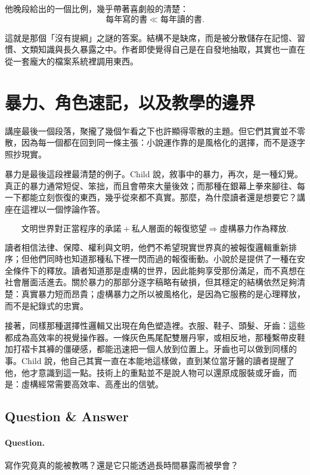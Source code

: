 他晚段給出的一個比例，幾乎帶著喜劇般的清楚：
\begin{equation}
\text{每年寫的書} \ll \text{每年讀的書}.
\end{equation}

這就是那個「沒有提綱」之謎的答案。結構不是缺席，而是被分散儲存在記憶、習慣、文類知識與長久暴露之中。作者即使覺得自己是在自發地抽取，其實也一直在從一套龐大的檔案系統裡調用東西。

\section{暴力、角色速記，以及教學的邊界}

講座最後一個段落，聚攏了幾個乍看之下也許顯得零散的主題。但它們其實並不零散，因為每一個都在回到同一條主張：小說運作靠的是風格化的選擇，而不是逐字照抄現實。

暴力是最後這段裡最清楚的例子。Child 說，敘事中的暴力，再次，是一種幻覺。真正的暴力通常短促、笨拙，而且會帶來大量後效；而那種在銀幕上拳來腳往、每一下都能立刻恢復的東西，幾乎從來都不真實。那麼，為什麼讀者還是想要它？講座在這裡以一個悖論作答。

\begin{equation}
\text{文明世界對正當程序的承諾} + \text{私人層面的報復慾望}
\Longrightarrow
\text{虛構暴力作為釋放}.
\end{equation}

讀者相信法律、保障、權利與文明，他們不希望現實世界真的被報復邏輯重新排序；但他們同時也知道那種私下裡一閃而過的報復衝動。小說於是提供了一種在安全條件下的釋放。讀者知道那是虛構的世界，因此能夠享受那份滿足，而不真想在社會層面活進去。關於暴力的那部分逐字稿略有破損，但其穩定的結構依然足夠清楚：真實暴力短而昂貴；虛構暴力之所以被風格化，是因為它服務的是心理釋放，而不是紀錄式的忠實。

接著，同樣那種選擇性邏輯又出現在角色塑造裡。衣服、鞋子、頭髮、牙齒：這些都成為高效率的視覺操作器。一條灰色馬尾配雙層丹寧，或相反地，那種繫帶皮鞋加打褶卡其褲的僵硬感，都能迅速把一個人放到位置上。牙齒也可以做到同樣的事。Child 說，他自己其實一直在本能地這樣做，直到某位當牙醫的讀者提醒了他，他才意識到這一點。技術上的重點並不是說人物可以還原成服裝或牙齒，而是：虛構經常需要高效率、高產出的信號。

\subsection{Question \& Answer}

\paragraph{Question.} 寫作究竟真的能被教嗎？還是它只能透過長時間暴露而被學會？

